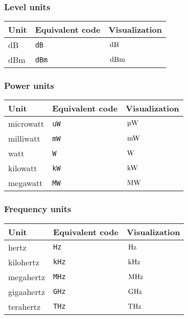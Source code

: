 \documentclass[11pt,a4paper,openany]{book}
\newcommand*{\cs}[1]{\texttt{\char92#1}}
\begin{document}
\subsubsection{Level units}
\begin{center}
\begin{tabular}{lll}
\toprule
Unit & Equivalent code & Visualization\\
\midrule
dB & \cs{dB} & $\,\mathrm{dB}$ \\
dBm & \cs{dBm} & $\,\mathrm{dBm}$\\
\bottomrule
\end{tabular}
\end{center}
\subsubsection{Power units}
\begin{center}
\begin{tabular}{lll}
\toprule
Unit & Equivalent code & Visualization\\
\midrule
microwatt & \cs{uW} & $\uW$\\
milliwatt & \cs{mW} & $\,\mathrm{mW}$ \\
watt & \cs{W} & $\,\mathrm{W}$\\
kilowatt & \cs{kW} & $\,\mathrm{kW}$\\
megawatt & \cs{MW} & $\,\mathrm{MW}$\\
\bottomrule
\end{tabular}
\end{center}
\subsubsection{Frequency units}
\begin{center}
\begin{tabular}{lll}
\toprule
Unit & Equivalent code & Visualization\\
\midrule
hertz & \cs{Hz} & $\,\mathrm{Hz}$\\
kilohertz & \cs{kHz} & $\,\mathrm{kHz}$ \\
megahertz & \cs{MHz} & $\,\mathrm{MHz}$\\
gigaahertz& \cs{GHz} & $\,\mathrm{GHz}$\\
terahertz & \cs{THz} & $\,\mathrm{THz}$\\
\bottomrule
\end{tabular}
\end{center}
\end{document}
